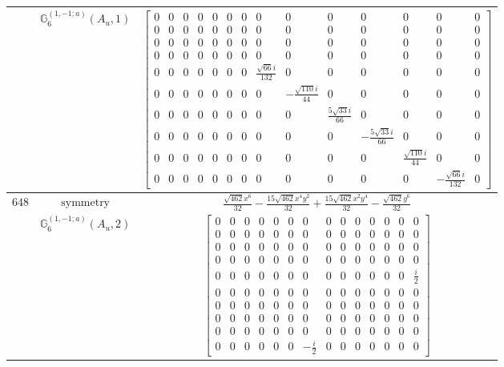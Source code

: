 \documentclass[fleqn,8pt,landscape]{jsarticle}
\begin{document}
\begin{longtable}{ccc}
$  $ & $ \mathbb{G}_{6}^{(1,-1;a)}(A_{u},1) $ & $ \begin{bmatrix} 0 & 0 & 0 & 0 & 0 & 0 & 0 & 0 & 0 & 0 & 0 & 0 & 0 & 0 \\ 0 & 0 & 0 & 0 & 0 & 0 & 0 & 0 & 0 & 0 & 0 & 0 & 0 & 0 \\ 0 & 0 & 0 & 0 & 0 & 0 & 0 & 0 & 0 & 0 & 0 & 0 & 0 & 0 \\ 0 & 0 & 0 & 0 & 0 & 0 & 0 & 0 & 0 & 0 & 0 & 0 & 0 & 0 \\ 0 & 0 & 0 & 0 & 0 & 0 & 0 & \frac{\sqrt{66} i}{132} & 0 & 0 & 0 & 0 & 0 & 0 \\ 0 & 0 & 0 & 0 & 0 & 0 & 0 & 0 & - \frac{\sqrt{110} i}{44} & 0 & 0 & 0 & 0 & 0 \\ 0 & 0 & 0 & 0 & 0 & 0 & 0 & 0 & 0 & \frac{5 \sqrt{33} i}{66} & 0 & 0 & 0 & 0 \\ 0 & 0 & 0 & 0 & 0 & 0 & 0 & 0 & 0 & 0 & - \frac{5 \sqrt{33} i}{66} & 0 & 0 & 0 \\ 0 & 0 & 0 & 0 & 0 & 0 & 0 & 0 & 0 & 0 & 0 & \frac{\sqrt{110} i}{44} & 0 & 0 \\ 0 & 0 & 0 & 0 & 0 & 0 & 0 & 0 & 0 & 0 & 0 & 0 & - \frac{\sqrt{66} i}{132} & 0 \end{bmatrix} $ \\ \hline
$ 648 $ & $ \text{symmetry} $ & $ \frac{\sqrt{462} x^{6}}{32} - \frac{15 \sqrt{462} x^{4} y^{2}}{32} + \frac{15 \sqrt{462} x^{2} y^{4}}{32} - \frac{\sqrt{462} y^{6}}{32} $ \\
$  $ & $ \mathbb{G}_{6}^{(1,-1;a)}(A_{u},2) $ & $ \begin{bmatrix} 0 & 0 & 0 & 0 & 0 & 0 & 0 & 0 & 0 & 0 & 0 & 0 & 0 & 0 \\ 0 & 0 & 0 & 0 & 0 & 0 & 0 & 0 & 0 & 0 & 0 & 0 & 0 & 0 \\ 0 & 0 & 0 & 0 & 0 & 0 & 0 & 0 & 0 & 0 & 0 & 0 & 0 & 0 \\ 0 & 0 & 0 & 0 & 0 & 0 & 0 & 0 & 0 & 0 & 0 & 0 & 0 & 0 \\ 0 & 0 & 0 & 0 & 0 & 0 & 0 & 0 & 0 & 0 & 0 & 0 & 0 & \frac{i}{2} \\ 0 & 0 & 0 & 0 & 0 & 0 & 0 & 0 & 0 & 0 & 0 & 0 & 0 & 0 \\ 0 & 0 & 0 & 0 & 0 & 0 & 0 & 0 & 0 & 0 & 0 & 0 & 0 & 0 \\ 0 & 0 & 0 & 0 & 0 & 0 & 0 & 0 & 0 & 0 & 0 & 0 & 0 & 0 \\ 0 & 0 & 0 & 0 & 0 & 0 & 0 & 0 & 0 & 0 & 0 & 0 & 0 & 0 \\ 0 & 0 & 0 & 0 & 0 & 0 & - \frac{i}{2} & 0 & 0 & 0 & 0 & 0 & 0 & 0 \end{bmatrix} $ \\ \hline

\end{longtable}
\end{document}
